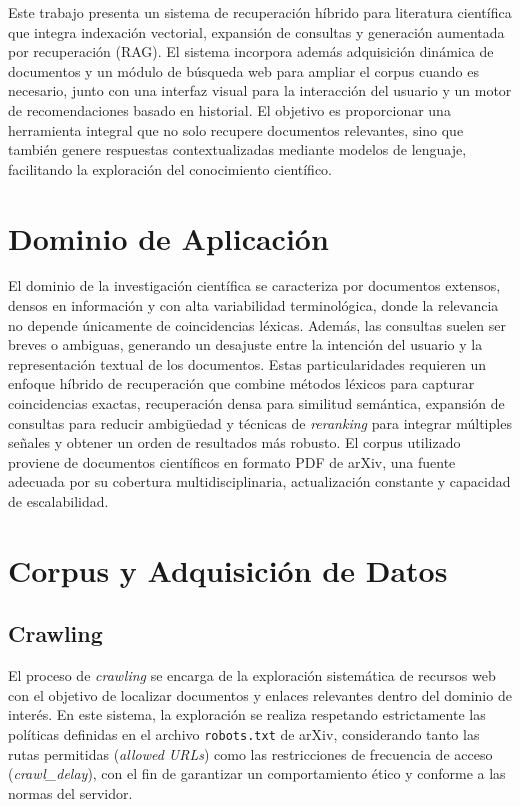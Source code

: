 \documentclass[runningheads]{llncs}
\begin{document}
Este trabajo presenta un sistema de recuperación híbrido para literatura científica que integra indexación vectorial, 
expansión de consultas y generación aumentada por recuperación (RAG). 
El sistema incorpora además adquisición dinámica de documentos y un módulo de búsqueda web para ampliar el corpus cuando es necesario, 
junto con una interfaz visual para la interacción del usuario y un motor de recomendaciones basado en historial. 
El objetivo es proporcionar una herramienta integral que no solo recupere documentos relevantes, 
sino que también genere respuestas contextualizadas mediante modelos de lenguaje, facilitando la exploración del conocimiento científico.

\section{Dominio de Aplicación}

El dominio de la investigación científica se caracteriza por documentos extensos, densos en información y 
con alta variabilidad terminológica, donde la relevancia no depende únicamente de coincidencias léxicas. 
Además, las consultas suelen ser breves o ambiguas, generando un desajuste entre la intención del usuario y 
la representación textual de los documentos. 
Estas particularidades requieren un enfoque híbrido de recuperación que combine métodos léxicos para capturar 
coincidencias exactas, recuperación densa para similitud semántica, expansión de consultas para reducir ambigüedad y 
técnicas de \textit{reranking} para integrar múltiples señales y obtener un orden de resultados más robusto. 
El corpus utilizado proviene de documentos científicos en formato PDF de arXiv, una fuente adecuada por su cobertura multidisciplinaria, 
actualización constante y capacidad de escalabilidad.

\section{Corpus y Adquisición de Datos}

\subsection{Crawling}

El proceso de \textit{crawling} se encarga de la exploración sistemática de recursos web
con el objetivo de localizar documentos y enlaces relevantes dentro del dominio de interés.
En este sistema, la exploración se realiza respetando estrictamente las políticas definidas en
el archivo \texttt{robots.txt} de arXiv, considerando tanto las rutas permitidas (\textit{allowed URLs})
como las restricciones de frecuencia de acceso (\textit{crawl\_delay}),
con el fin de garantizar un comportamiento ético y conforme a las normas del servidor.
\end{document}

